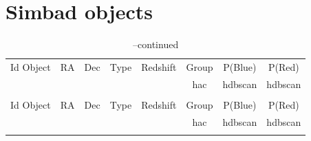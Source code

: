 \documentclass[fleqn,usenatbib]{mnras}
\begin{document}
\newcommand\TableHeader{
  \hline\hline
  Id Object & \(\mathrm{RA}\) & \(\mathrm{Dec}\) & Type & Redshift & Group & P(Blue) &  P(Red)\\
            &                 &                  &      &          &{\sc hac}& {\sc hdbscan}& {\sc hdbscan} \\
  \hline 
}

\clearpage
\section{Simbad objects}

\begin{center}
\onecolumn
\begin{longtable}{l r r c c c c c}
 \caption{Simbad sources. \label{tab:simbad}}\\
 \TableHeader\endfirsthead 
 \caption[]{--continued}\\
 \TableHeader\endhead
 \hline \endfoot
 
 \end{longtable} 
 \end{center}

\clearpage


\clearpage


\bsp	%
\label{lastpage}
\end{document}
